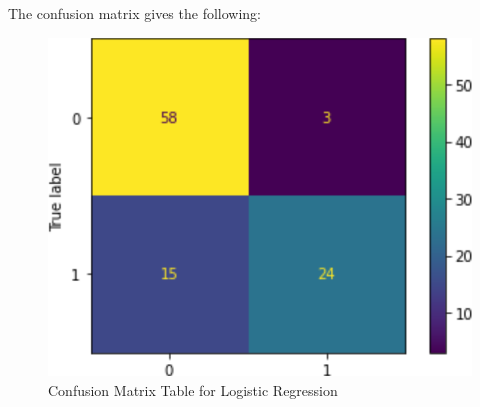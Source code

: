 \documentclass[conference]{IEEEtran}
\begin{document}
The confusion matrix gives the following:\\
\begin{figure}[h]
    \centering
    \includegraphics[scale=0.47]{figs/PredictL.png}
    \caption{Confusion Matrix Table for Logistic Regression}
    \label{dabc}        
\end{figure}


\end{document}
